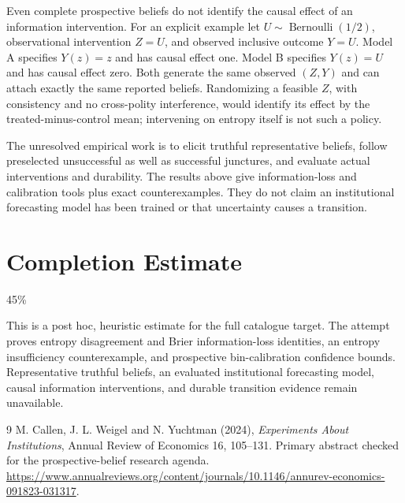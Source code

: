 \documentclass[11pt,a4paper]{article}
\begin{document}
Even complete prospective beliefs do not identify the causal effect of an information intervention. For an explicit example let $U\sim\operatorname{Bernoulli}(1/2)$, observational intervention $Z=U$, and observed inclusive outcome $Y=U$. Model A specifies $Y(z)=z$ and has causal effect one. Model B specifies $Y(z)=U$ and has causal effect zero. Both generate the same observed $(Z,Y)$ and can attach exactly the same reported beliefs. Randomizing a feasible $Z$, with consistency and no cross-polity interference, would identify its effect by the treated-minus-control mean; intervening on entropy itself is not such a policy.

The unresolved empirical work is to elicit truthful representative beliefs, follow preselected unsuccessful as well as successful junctures, and evaluate actual interventions and durability. The results above give information-loss and calibration tools plus exact counterexamples. They do not claim an institutional forecasting model has been trained or that uncertainty causes a transition.

\section{Completion Estimate}
45\%

This is a post hoc, heuristic estimate for the full catalogue target.
The attempt proves entropy disagreement and Brier information-loss identities, an entropy insufficiency counterexample, and prospective bin-calibration confidence bounds. Representative truthful beliefs, an evaluated institutional forecasting model, causal information interventions, and durable transition evidence remain unavailable.

\begin{thebibliography}{9}
 M. Callen, J. L. Weigel and N. Yuchtman (2024), \emph{Experiments About Institutions}, Annual Review of Economics 16, 105--131. Primary abstract checked for the prospective-belief research agenda. \url{https://www.annualreviews.org/content/journals/10.1146/annurev-economics-091823-031317}.
\end{thebibliography}
\end{document}
